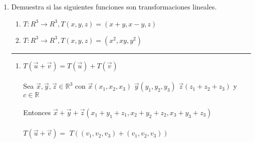 \documentclass[a4paper,10pt]{article}
\newcommand*\circled[1]{\tikz[baseline=(char.base)]{
            \node[shape=circle,draw,inner sep=2pt] (char) {#1};}}
\begin{document}
\begin{enumerate}
  
\item Demuestra si las siguientes funciones son transformaciones lineales.
      \begin{enumerate}
        \item $T:R^3\rightarrow R^3,T(x,y,z)=(x+y,x-y,z)$
        \item $T:R^3\rightarrow R^3,T(x,y,z)=(x^2,xy,y^2)$
      \end{enumerate}

      {\color{amber} \rule{\linewidth}{0.5mm} }      

      \begin{enumerate}
        
        \item \textcolor{guppiegreen}{ \circled{1}} \hspace{.2cm} {\textcolor{guppiegreen}{$T(\vec{u}+\vec{v})=T(\vec{u})+T(\vec{v})$}} \\\\
              Sea $\vec{x},\vec{y},\vec{z} \in \mathds{R}^{3}$ con $\vec{x}(x_{1},x_{2},x_{3})$ $\vec{y}(y_{1},y_{2},y_{3})$ $\vec{z}(z_{1}+z_{2}+z_{3})$ y $c \in \mathds{R}$\\\\
              Entonces $\vec{x}+\vec{y}+\vec{z}(x_{1}+y_{1}+z_{1},x_{2}+y_{2}+z_{2},x_{3}+y_{3}+z_{3})$\\\\
              $T(\vec{u}+\vec{v}) =$ $ T((v_{1},v_{2},v_{3})+(v_{1},v_{2},v_{3}))$ \\\\
              \\\\
              \\\\
              \\\\

\end{enumerate}
\end{enumerate}
\end{document}
